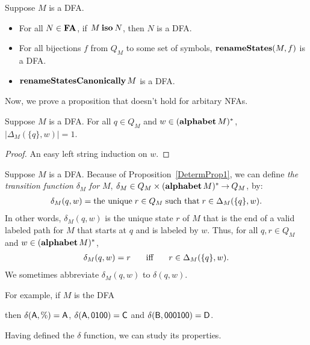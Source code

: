 \begin{proposition}
Suppose $M$ is a DFA.
\begin{itemize}
\item For all $N\in\mathbf{FA}$, if $M\mathbin{\mathbf{iso}} N$, then $N$ is a DFA.

\item For all bijections $f$ from $Q_M$ to some set of symbols,
$\mathbf{renameStates}(M, f)$ is a DFA.

\item $\mathbf{renameStatesCanonically}\,M$ is a DFA.
\end{itemize}
\end{proposition}

Now, we prove a proposition that doesn't hold for arbitary NFAs.

\begin{proposition}
\label{DetermProp1}

Suppose $M$ is a DFA.  For all $q\in Q_M$ and $w\in(\mathbf{alphabet}\,M)^*$,
$|\Delta_M(\{q\},w)|=1${.}
\end{proposition}

\begin{proof}
An easy left string induction on $w$.
\end{proof}

%
%
Suppose $M$ is a DFA.  Because of Proposition~\ref{DetermProp1}, we
can define \emph{the transition function} $\delta_M$ \emph{for} $M$,
$\delta_M\in Q_M\times(\mathbf{alphabet}\,M)^*\mathbin{\to} Q_M$, by:
\begin{gather*}
\delta_M(q,w) = \allowbreak\mbox{the unique}\allowbreak\; r\in Q_M\;\allowbreak\mbox{such that}\allowbreak\;
r\in\Delta_M(\{q\},w) .
\end{gather*}
In other words, $\delta_M(q,w)$ is the unique state $r$ of $M$ that
is the end of a valid labeled path for $M$ that starts at $q$ and
is labeled by $w$.
Thus, for all $q,r\in Q_M$ and $w\in(\mathbf{alphabet}\,M)^*$,
\begin{gather*}
\delta_M(q,w)=r\quad\mathrel{\;\;\allowbreak\mbox{iff}\allowbreak\;\;}\quad r\in\Delta_M(\{q\},w) .
\end{gather*}
We sometimes abbreviate $\delta_M(q,w)$ to $\delta(q,w)$.

For example, if $M$ is the DFA
\begin{center}

\end{center}
then $\delta(\mathsf{A}, \%)={\mathsf{A}}$, $\delta(\mathsf{A}, \mathsf{0100})={\mathsf{C}}$
and $\delta(\mathsf{B}, \mathsf{000100})={\mathsf{D}}$.

Having defined the $\delta$ function, we can study its properties.

